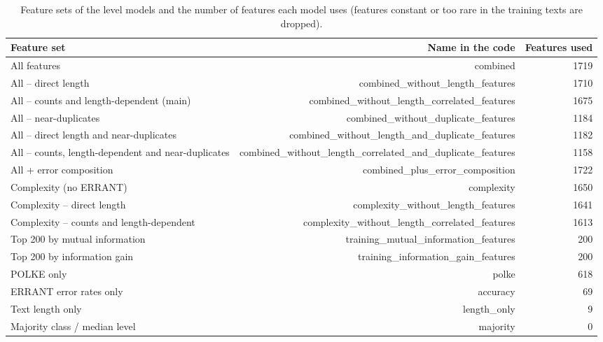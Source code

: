\begin{table}[t]
\centering
\small
\begin{tabular}{lrr}
\toprule
Feature set & Name in the code & Features used \\
\midrule
All features & combined & 1719 \\
All -- direct length & combined\_without\_length\_features & 1710 \\
All -- counts and length-dependent (main) & combined\_without\_length\_correlated\_features & 1675 \\
All -- near-duplicates & combined\_without\_duplicate\_features & 1184 \\
All -- direct length and near-duplicates & combined\_without\_length\_and\_duplicate\_features & 1182 \\
All -- counts, length-dependent and near-duplicates & combined\_without\_length\_correlated\_and\_duplicate\_features & 1158 \\
All + error composition & combined\_plus\_error\_composition & 1722 \\
Complexity (no ERRANT) & complexity & 1650 \\
Complexity -- direct length & complexity\_without\_length\_features & 1641 \\
Complexity -- counts and length-dependent & complexity\_without\_length\_correlated\_features & 1613 \\
Top 200 by mutual information & training\_mutual\_information\_features & 200 \\
Top 200 by information gain & training\_information\_gain\_features & 200 \\
POLKE only & polke & 618 \\
ERRANT error rates only & accuracy & 69 \\
Text length only & length\_only & 9 \\
Majority class / median level & majority & 0 \\
\bottomrule
\end{tabular}
\caption{Feature sets of the level models and the number of features each model uses (features constant or too rare in the training texts are dropped).}
\label{tab:table_2_feature_sets}
\end{table}

